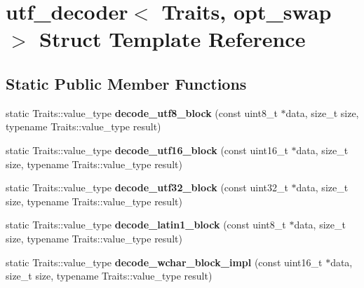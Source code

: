 \hypertarget{structutf__decoder}{}\section{utf\+\_\+decoder$<$ Traits, opt\+\_\+swap $>$ Struct Template Reference}
\label{structutf__decoder}
\subsection*{Static Public Member Functions}
\begin{DoxyCompactItemize}
\item 
\hypertarget{structutf__decoder_a671829bbdba1eac5c8bd2bf781eae498}{}static Traits\+::value\+\_\+type {\bfseries decode\+\_\+utf8\+\_\+block} (const uint8\+\_\+t $\ast$data, size\+\_\+t size, typename Traits\+::value\+\_\+type result)\label{structutf__decoder_a671829bbdba1eac5c8bd2bf781eae498}

\item 
\hypertarget{structutf__decoder_ac22afd983ac79318f0e7d07669bda8d1}{}static Traits\+::value\+\_\+type {\bfseries decode\+\_\+utf16\+\_\+block} (const uint16\+\_\+t $\ast$data, size\+\_\+t size, typename Traits\+::value\+\_\+type result)\label{structutf__decoder_ac22afd983ac79318f0e7d07669bda8d1}

\item 
\hypertarget{structutf__decoder_a8bed41cc707328e8d8ab91fd7c3c943e}{}static Traits\+::value\+\_\+type {\bfseries decode\+\_\+utf32\+\_\+block} (const uint32\+\_\+t $\ast$data, size\+\_\+t size, typename Traits\+::value\+\_\+type result)\label{structutf__decoder_a8bed41cc707328e8d8ab91fd7c3c943e}

\item 
\hypertarget{structutf__decoder_a3f728755fa7cc552e30e8d8776cad1ce}{}static Traits\+::value\+\_\+type {\bfseries decode\+\_\+latin1\+\_\+block} (const uint8\+\_\+t $\ast$data, size\+\_\+t size, typename Traits\+::value\+\_\+type result)\label{structutf__decoder_a3f728755fa7cc552e30e8d8776cad1ce}

\item 
\hypertarget{structutf__decoder_a56b161067860fde1ed534ac3b7399e36}{}static Traits\+::value\+\_\+type {\bfseries decode\+\_\+wchar\+\_\+block\+\_\+impl} (const uint16\+\_\+t $\ast$data, size\+\_\+t size, typename Traits\+::value\+\_\+type result)\label{structutf__decoder_a56b161067860fde1ed534ac3b7399e36}


\end{DoxyCompactItemize}
